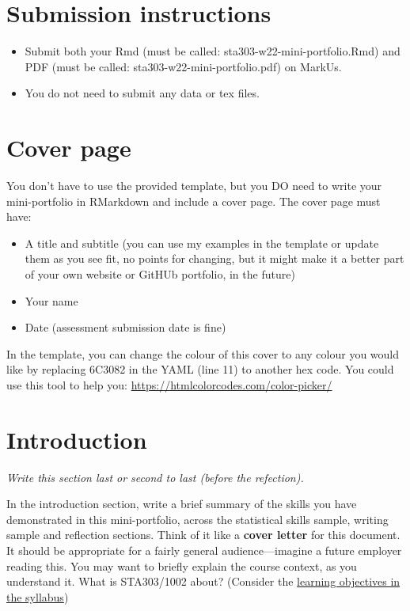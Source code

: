 \documentclass[
  openany]{book}
\providecommand{\tightlist}{%
  \setlength{\itemsep}{0pt}\setlength{\parskip}{0pt}}
\begin{document}
\hypertarget{submission-instructions}{%
\section{Submission instructions}\label{submission-instructions}}

\begin{itemize}
\tightlist
\item
  Submit both your Rmd (must be called: sta303-w22-mini-portfolio.Rmd) and PDF (must be called: sta303-w22-mini-portfolio.pdf) on MarkUs.
\item
  You do not need to submit any data or tex files.
\end{itemize}

\hypertarget{cover-page}{%
\section{Cover page}\label{cover-page}}

You don't have to use the provided template, but you DO need to write your mini-portfolio in RMarkdown and include a cover page. The cover page must have:

\begin{itemize}
\item
  A title and subtitle (you can use my examples in the template or update them as you see fit, no points for changing, but it might make it a better part of your own website or GitHUb portfolio, in the future)
\item
  Your name
\item
  Date (assessment submission date is fine)
\end{itemize}

In the template, you can change the colour of this cover to any colour you would like by replacing 6C3082 in the YAML (line 11) to another hex code. You could use this tool to help you: \url{https://htmlcolorcodes.com/color-picker/}

\hypertarget{introduction}{%
\section{Introduction}\label{introduction}}

\emph{Write this section last or second to last (before the refection).}

In the introduction section, write a brief summary of the skills you have demonstrated in this mini-portfolio, across the statistical skills sample, writing sample and reflection sections. Think of it like a \textbf{cover letter} for this document. It should be appropriate for a fairly general audience---imagine a future employer reading this. You may want to briefly explain the course context, as you understand it. What is STA303/1002 about? (Consider the \href{https://sta303-bolton.github.io/sta303-w22-courseguide/syllabus.html\#learning-objectives}{learning objectives in the syllabus})
\end{document}
